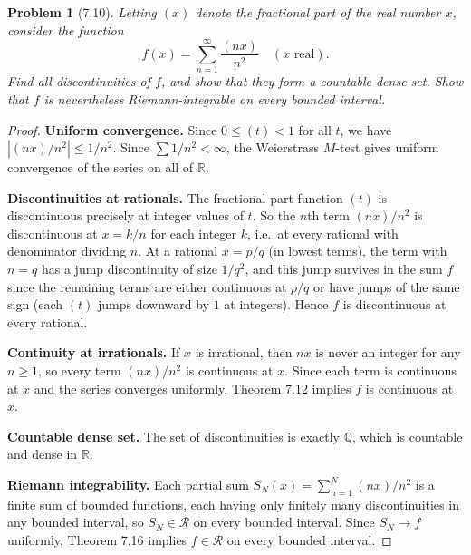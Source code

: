 \documentclass[12 pt]{article}
\newtheorem{prob}{Problem}
\begin{document}
\begin{prob}[7.10]
Letting $(x)$ denote the fractional part of the real number $x$, consider the function
$$
f(x)=\sum_{n=1}^{\infty} \frac{(n x)}{n^{2}} \quad(x \text{ real}).
$$
Find all discontinuities of $f$, and show that they form a countable dense set. Show that $f$ is nevertheless Riemann-integrable on every bounded interval.
\end{prob}
\begin{proof}
\textbf{Uniform convergence.} Since $0 \leq (t) < 1$ for all $t$, we have $|(nx)/n^2| \leq 1/n^2$. Since $\sum 1/n^2 < \infty$, the Weierstrass $M$-test gives uniform convergence of the series on all of $\mathbb{R}$.

\textbf{Discontinuities at rationals.} The fractional part function $(t)$ is discontinuous precisely at integer values of $t$. So the $n$th term $(nx)/n^2$ is discontinuous at $x = k/n$ for each integer $k$, i.e.\ at every rational with denominator dividing $n$. At a rational $x = p/q$ (in lowest terms), the term with $n = q$ has a jump discontinuity of size $1/q^2$, and this jump survives in the sum $f$ since the remaining terms are either continuous at $p/q$ or have jumps of the same sign (each $(t)$ jumps downward by $1$ at integers). Hence $f$ is discontinuous at every rational.

\textbf{Continuity at irrationals.} If $x$ is irrational, then $nx$ is never an integer for any $n \geq 1$, so every term $(nx)/n^2$ is continuous at $x$. Since each term is continuous at $x$ and the series converges uniformly, Theorem 7.12 implies $f$ is continuous at $x$.

\textbf{Countable dense set.} The set of discontinuities is exactly $\mathbb{Q}$, which is countable and dense in $\mathbb{R}$.

\textbf{Riemann integrability.} Each partial sum $S_N(x) = \sum_{n=1}^N (nx)/n^2$ is a finite sum of bounded functions, each having only finitely many discontinuities in any bounded interval, so $S_N \in \mathscr{R}$ on every bounded interval. Since $S_N \to f$ uniformly, Theorem 7.16 implies $f \in \mathscr{R}$ on every bounded interval.
\end{proof}
\end{document}

